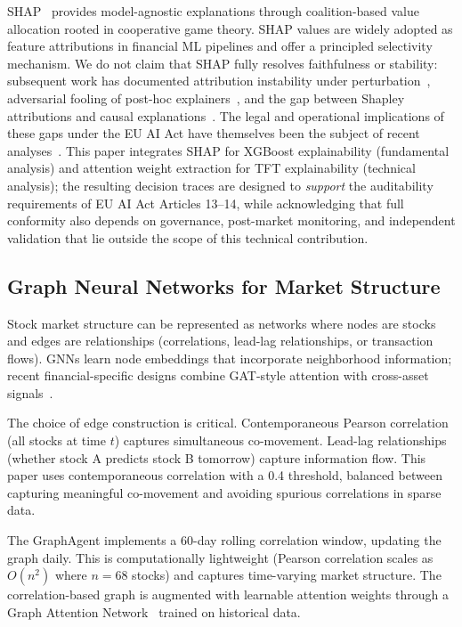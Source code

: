 \documentclass[conference]{IEEEtran}
\begin{document}
SHAP~\cite{ref:shap} provides model-agnostic explanations through coalition-based value allocation rooted in cooperative game theory. SHAP values are widely adopted as feature attributions in financial ML pipelines and offer a principled selectivity mechanism. We do not claim that SHAP fully resolves faithfulness or stability: subsequent work has documented attribution instability under perturbation~\cite{ref:alvarez_melis}, adversarial fooling of post-hoc explainers~\cite{ref:slack_fooling}, and the gap between Shapley attributions and causal explanations~\cite{ref:kumar_shap}. The legal and operational implications of these gaps under the EU AI Act have themselves been the subject of recent analyses~\cite{ref:veale_aiact,ref:mokander_audit}. This paper integrates SHAP for XGBoost explainability (fundamental analysis) and attention weight extraction for TFT explainability (technical analysis); the resulting decision traces are designed to \emph{support} the auditability requirements of EU AI Act Articles 13--14, while acknowledging that full conformity also depends on governance, post-market monitoring, and independent validation that lie outside the scope of this technical contribution.

\subsection{Graph Neural Networks for Market Structure}

Stock market structure can be represented as networks where nodes are stocks and edges are relationships (correlations, lead-lag relationships, or transaction flows). GNNs learn node embeddings that incorporate neighborhood information; recent financial-specific designs combine GAT-style attention with cross-asset signals~\cite{ref:fingat,ref:mansf}.

The choice of edge construction is critical. Contemporaneous Pearson correlation (all stocks at time $t$) captures simultaneous co-movement. Lead-lag relationships (whether stock A predicts stock B tomorrow) capture information flow. This paper uses contemporaneous correlation with a 0.4 threshold, balanced between capturing meaningful co-movement and avoiding spurious correlations in sparse data.

The GraphAgent implements a 60-day rolling correlation window, updating the graph daily. This is computationally lightweight (Pearson correlation scales as $O(n^2)$ where $n=68$ stocks) and captures time-varying market structure. The correlation-based graph is augmented with learnable attention weights through a Graph Attention Network~\cite{ref:gat} trained on historical data.
\end{document}
